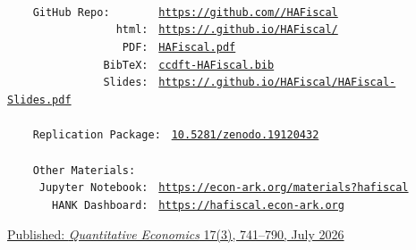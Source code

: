 \documentclass[\latexroot/\projectname]{subfiles}
\begin{document}
\whenintegrated{\label{links}} %

\providecommand{\REMARK}{\href{https://github.com/econ-ark/REMARK}{REMARK}}
\begin{footnotesize}
  \setlength{\parskip}{0pt}
  \parbox{0.9\textwidth}{
    \begin{tabbing}
      \texttt{~~~~~~~~~~~~~~~~~~~~~~~} \= \=  \\
      \texttt{~~~~GitHub~Repo:~~~~~~~} \> \> \texttt{\href{https://github.com/\owner/HAFiscal}{https://github.com/\owner/HAFiscal}} \\
      \texttt{~~~~~~~~~~~~~~~~~html:~} \> \> \texttt{\href{https://\owner.github.io/HAFiscal/}{https://\owner.github.io/HAFiscal/}} \\
      \texttt{~~~~~~~~~~~~~~~~~~PDF:~} \> \> \texttt{\href{https://github.com/\owner/HAFiscal/blob/master/HAFiscal.pdf}{HAFiscal.pdf}} \\
      \texttt{~~~~~~~~~~~~~~~BibTeX:~} \> \> \texttt{\href{https://\owner.github.io/HAFiscal/ccdft-HAFiscal.bib}{ccdft-HAFiscal.bib}} \\
      \texttt{~~~~~~~~~~~~~~~Slides:~} \> \> \texttt{\href{https://\owner.github.io/HAFiscal/HAFiscal-Slides.pdf}{https://\owner.github.io/HAFiscal/HAFiscal-Slides.pdf}} \\
      \texttt{~~~~~~~~~~~~~~~~~~~~~~~} \> \>  \\
      \texttt{~~~~Replication~Package:~} \> \> \texttt{\href{https://doi.org/10.5281/zenodo.19120432}{10.5281/zenodo.19120432}} \\
      \texttt{~~~~~~~~~~~~~~~~~~~~~~~} \> \>  \\
      \texttt{~~~~Other~Materials:~~~} \> \> \\
      \texttt{~~~~~Jupyter~Notebook:~} \> \> \texttt{\href{https://econ-ark.org/materials?hafiscal}{https://econ-ark.org/materials?hafiscal}} \\
      \texttt{~~~~~~~HANK~Dashboard:~} \> \> \texttt{\href{https://hafiscal.econ-ark.org}{https://hafiscal.econ-ark.org}} \\
    \end{tabbing}
  } %
\end{footnotesize}
\vspace{-0.3\baselineskip}

\centerline{\href{https://doi.org/10.3982/QE2442}{Published: \textit{Quantitative Economics} 17(3), 741--790, July 2026}}
\vspace{-0.3\baselineskip}
\end{document}
